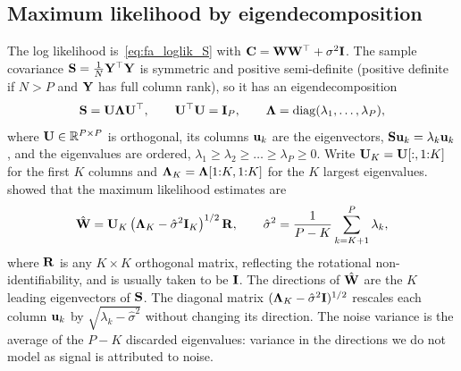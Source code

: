 \subsection{Maximum likelihood by eigendecomposition}

The log likelihood is~\eqref{eq:fa_loglik_S} with $\mathbf{C}=\mathbf{W}\mathbf{W}^\top+\sigma^2\mathbf{I}$. The sample covariance $\mathbf{S}=\frac1N\mathbf{Y}^\top\mathbf{Y}$ is symmetric and positive semi-definite (positive definite if $N>P$ and $\mathbf{Y}$ has full column rank), so it has an eigendecomposition
\begin{equation}
  \mathbf{S}=\mathbf{U}\boldsymbol{\Lambda}\mathbf{U}^\top, \qquad \mathbf{U}^\top\mathbf{U}=\mathbf{I}_P, \qquad \boldsymbol{\Lambda}=\operatorname{diag}(\lambda_1,\dots,\lambda_P),
  \label{eq:eig}
\end{equation}
where $\mathbf{U}\in\mathbb{R}^{P\times P}$ is orthogonal, its columns $\mathbf{u}_k$ are the eigenvectors, $\mathbf{S}\mathbf{u}_k=\lambda_k\mathbf{u}_k$, and the eigenvalues are ordered, $\lambda_1\geq\lambda_2\geq\dots\geq\lambda_P\geq0$. Write $\mathbf{U}_K=\mathbf{U}[:,1{:}K]$ for the first $K$ columns and $\boldsymbol{\Lambda}_K=\boldsymbol{\Lambda}[1{:}K,1{:}K]$ for the $K$ largest eigenvalues. \citet{tipping1999} showed that the maximum likelihood estimates are
\begin{equation}
  \hat{\mathbf{W}}=\mathbf{U}_K\left(\boldsymbol{\Lambda}_K-\hat\sigma^2\mathbf{I}_K\right)^{1/2}\mathbf{R}, \qquad \hat\sigma^2=\frac1{P-K}\sum_{k=K+1}^P\lambda_k,
  \label{eq:ppca_ml}
\end{equation}
where $\mathbf{R}$ is any $K\times K$ orthogonal matrix, reflecting the rotational non-identifiability, and is usually taken to be $\mathbf{I}$. The directions of $\hat{\mathbf{W}}$ are the $K$ leading eigenvectors of $\mathbf{S}$. The diagonal matrix $(\boldsymbol{\Lambda}_K-\hat\sigma^2\mathbf{I})^{1/2}$ rescales each column $\mathbf{u}_k$ by $\sqrt{\lambda_k-\hat\sigma^2}$ without changing its direction. The noise variance is the average of the $P-K$ discarded eigenvalues: variance in the directions we do not model as signal is attributed to noise.


